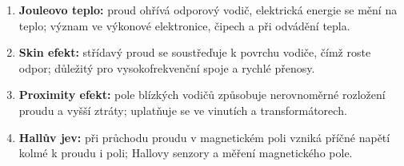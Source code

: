 \begin{enumerate}
\item \textbf{Jouleovo teplo:} proud ohřívá odporový vodič, elektrická energie se mění na teplo; význam ve výkonové elektronice, čipech a při odvádění tepla.
\item \textbf{Skin efekt:} střídavý proud se soustřeďuje k povrchu vodiče, čímž roste odpor; důležitý pro vysokofrekvenční spoje a rychlé přenosy.
\item \textbf{Proximity efekt:} pole blízkých vodičů způsobuje nerovnoměrné rozložení proudu a vyšší ztráty; uplatňuje se ve vinutích a transformátorech.
\item \textbf{Hallův jev:} při průchodu proudu v magnetickém poli vzniká příčné napětí kolmé k proudu i poli; Hallovy senzory a měření magnetického pole.
\end{enumerate}
